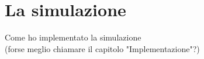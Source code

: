 
\chapter{La simulazione}\label{simulazione} %





Come ho implementato la simulazione 
\\
(forse meglio chiamare il capitolo "Implementazione"?)
 

